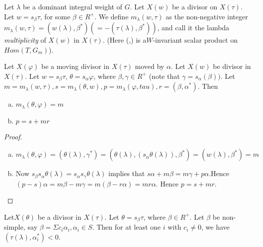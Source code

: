 \begin{definition}\label{chap9-definition-2.3}
Let $\lambda$ be a dominant integral weight of $G$. Let $X(w)$ be a divisor on $X(\tau)$. Let $w=s_{\beta}\tau$, for some $\beta \in R^{+}$. We define $m_{\lambda}(w, \tau)$ as the  non-negative integer $m_{\lambda}(w, \tau) = (w(\lambda), \beta^{*})(= -(\tau(\lambda), \beta^{*}))$, and call it the lambda \textit{multiplicity} of $X(w)$ in $X(\tau)$. (Here (,) is a$W$-invariant scalar product on $Hom(T, G_{m})$). 
\end{definition}

\begin{seclem}\label{chap9-lemma-2.4}
Let $X(\varphi)$ be a moving divisor in $X(\tau)$ moved by $\alpha$. Let $X(w)$ be divisor in $X(\tau)$. Let $w=s_{\beta}\tau$, $\theta = s_{\alpha}\varphi$, where $\beta, \gamma \in R^{+}$ (note that $\gamma = s_{\alpha}(\beta))$. Let $m=m_{\lambda}(w, \tau), s=m_{\lambda}(\theta, w), p=m_{\lambda}(\varphi, tau), r = (\beta, \alpha^{*})$.
Then
\begin{enumerate}[(a)]
\item $m_{\lambda}(\theta, \varphi) =m$ \label{chap9-lemma2.4-enum-1}
\item $p=s+mr$\label{chap9-lemma2.4-enum-2}
\end{enumerate}
\end{seclem} 

\medskip

\begin{proof}
~
\begin{enumerate}[(a)]
\item $m_{\lambda}(\theta, \varphi) = (\theta(\lambda), \gamma^{*}) = (\theta(\lambda), (s_{\alpha}\theta(\lambda)), \beta^{*}) =(w(\lambda), \beta^{*}) = m$

\item Now $s_{\beta}s_{\alpha}\theta(\lambda) = s_{\alpha}s_{\gamma}\theta(\lambda)$ implies that $s\alpha + m\beta =m\gamma+ p\alpha$.\break Hence $(p-s)\alpha=m\beta-m\gamma =m(\beta-r\alpha)=mr\alpha$. Hence $p=s+mr$.
\end{enumerate}
\end{proof}

\begin{seclem}\label{chap9-lemma-2.5}
Let\pageoriginale $X(\theta)$ be a divisor in $X(\tau)$. Let $\theta = s_{\beta}\tau$, where $\beta \in R^{+}$. Let $\beta$ be non-simple, say $\beta = \Sigma c_{i}\alpha_{i}, \alpha_{i} \in S$. Then for at least one $i$ with $c_{i}\neq 0$, we have
$(\tau (\lambda), \alpha_{i}^{*})< 0$.
\end{seclem}

